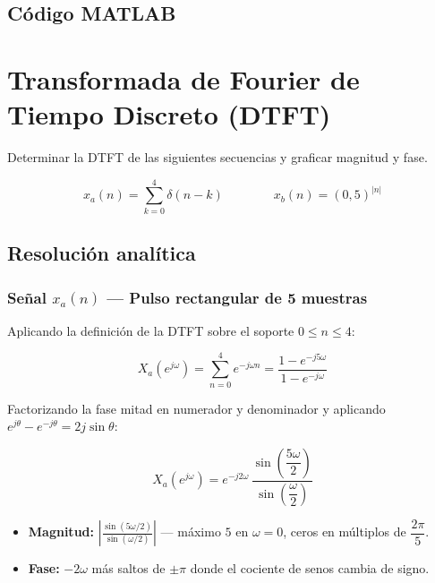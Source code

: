 \documentclass[../Main_Include.tex]{subfiles}
\begin{document}
\subsection*{Código MATLAB}



\newpage
\section{Transformada de Fourier de Tiempo Discreto (DTFT)}

Determinar la DTFT de las siguientes secuencias y graficar magnitud y fase.

\[
    x_a(n) = \sum_{k=0}^{4}\delta(n-k)
    \qquad\qquad
    x_b(n) = (0{,}5)^{|n|}
\]

\subsection*{Resolución analítica}

\subsubsection*{Señal $x_a(n)$ — Pulso rectangular de 5 muestras}

Aplicando la definición de la DTFT sobre el soporte $0 \le n \le 4$:

\[
    X_a(e^{j\omega}) = \sum_{n=0}^{4} e^{-j\omega n}
    = \frac{1 - e^{-j5\omega}}{1 - e^{-j\omega}}
\]

Factorizando la fase mitad en numerador y denominador y aplicando
$e^{j\theta} - e^{-j\theta} = 2j\sin\theta$:

\[
    \boxed{X_a(e^{j\omega}) = e^{-j2\omega}\,
    \frac{\sin\!\left(\dfrac{5\omega}{2}\right)}
         {\sin\!\left(\dfrac{\omega}{2}\right)}}
\]

\begin{itemize}[leftmargin=1.5cm, itemsep=2pt]
    \item \textbf{Magnitud:}
        $\displaystyle\left|\frac{\sin(5\omega/2)}{\sin(\omega/2)}\right|$
        — máximo $5$ en $\omega = 0$, ceros en múltiplos de $\dfrac{2\pi}{5}$.
    \item \textbf{Fase:} $-2\omega$ más saltos de $\pm\pi$ donde el
        cociente de senos cambia de signo.
\end{itemize}
\end{document}

